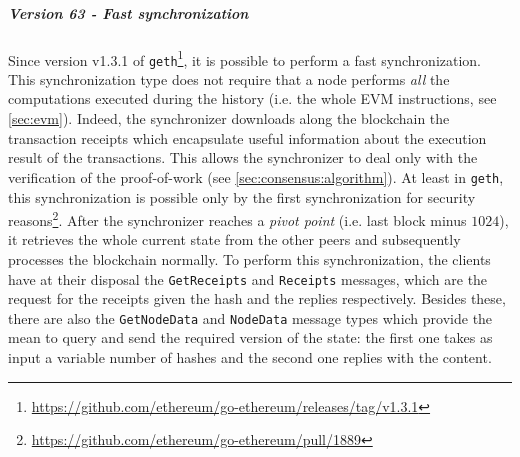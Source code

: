 \subparagraph{Version 63 - Fast synchronization}
\label{sec:fast-sync}
Since version v1.3.1 of
\texttt{geth}\footnote{\url{https://github.com/ethereum/go-ethereum/releases/tag/v1.3.1}},
it is possible to perform a fast synchronization. This synchronization type does
not require that a node performs \emph{all} the computations executed during the
history (i.e. the whole EVM instructions, see \autoref{sec:evm}). Indeed, the
synchronizer downloads along the blockchain the transaction receipts which
encapsulate useful information about the execution result of the transactions.
This allows the synchronizer to deal only with the verification of the
proof-of-work (see \autoref{sec:consensus:algorithm}). At least in
\texttt{geth}, this synchronization is possible only by the first
synchronization for security
reasons\footnote{\url{https://github.com/ethereum/go-ethereum/pull/1889}}. After
the synchronizer reaches a \emph{pivot point} (i.e. last block minus $1024$), it
retrieves the whole current state from the other peers and subsequently
processes the blockchain normally. To perform this synchronization, the clients
have at their disposal the \texttt{GetReceipts} and \texttt{Receipts} messages,
which are the request for the receipts given the hash and the replies
respectively. Besides these, there are also the \texttt{GetNodeData} and
\texttt{NodeData} message types which provide the mean to query and send the
required version of the state: the first one takes as input a variable number of
hashes and the second one replies with the content.
